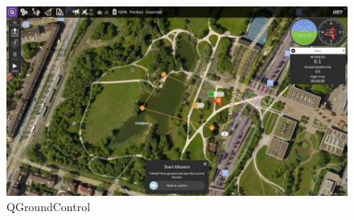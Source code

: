 \begin{figure} [H]
  \begin{center}
    \includegraphics[scale=1.2]{figs/Plataformas_Desarollo/software-qgc.jpg}
  \end{center}
  \caption{QGroundControl}
  \label{fig:QGroundControl}
  \vspace{-1.5em}
\end{figure}


































